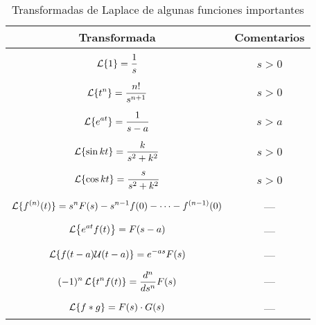 \documentclass[../ecuaciones_diferenciales.tex]{subfiles}
\begin{document}
\begin{table}[ht]
	\centering
	\begin{tabular}{c|c}
		Transformada                                                 & Comentarios
		\\[0.7em] \hline \\[-1.0em]
		\(\displaystyle \operatorname{\mathcal{L}}\{1\} = \frac{1}{s}\)                      & \(s>0\)
		\\[0.7em] \hline \\[-1.0em]
		\(\displaystyle \operatorname{\mathcal{L}}\{t^n\} = \frac{n!}{s^{n+1}}\)             & \(s>0\)
		\\[0.7em] \hline \\[-1.0em]
		\(\displaystyle \operatorname{\mathcal{L}}\{e^{at}\} = \frac{1}{s-a}\)               & \(s>a\)
		\\[0.7em] \hline \\[-1.0em]
		\(\displaystyle \operatorname{\mathcal{L}}\{\sin kt\} = \frac{k}{s^2+k^2}\)          & \(s>0\)
		\\[0.7em] \hline \\[-1.0em]
		\(\displaystyle \operatorname{\mathcal{L}}\{\cos kt\} = \frac{s}{s^2+k^2}\)          & \(s>0\)
		\\[0.7em] \hline \\[-1.0em]
		\(\displaystyle \operatorname{\mathcal{L}}\{f^{(n)}(t)\} = s^nF(s) - s^{n-1}f(0) - \cdots -
		f^{(n-1)}(0)\)                                               & ---
		\\[0.4em] \hline \\[-1.0em]
		\(\displaystyle \laplace\left\{e^{at}f(t)\right\} = F(s-a)\)       & ---
		\\[0.4em] \hline \\[-1.0em]
		\(\displaystyle \operatorname{\mathcal{L}}\{f(t-a)\mathcal{U}(t-a)\} = e^{-as}F(s)\) & ---
		\\[0.4em] \hline \\[-1.0em]
		\(\displaystyle (-1)^n\laplace\left\{t^nf(t)\right\} = \frac{\dif {}^n}{\dif s^n}
		F(s)\)                                                       & ---
		\\[0.7em] \hline \\[-1.0em]
		\(\displaystyle \operatorname{\mathcal{L}}\{f \ast g\} = F(s) \cdot G(s)\)           & ---
	\end{tabular}%
	\caption{Transformadas de Laplace de algunas funciones importantes}
\end{table}
\end{document}
